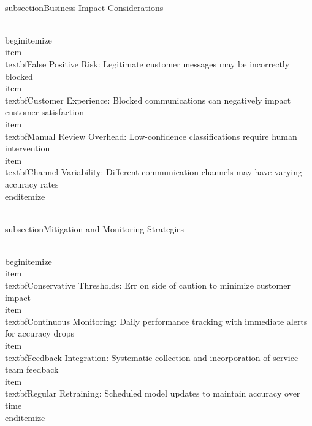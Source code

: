 \documentclass[12pt,a4paper]{article}
\begin{document}
\\subsection{Business Impact Considerations}

\\begin{itemize}
    \\item \\textbf{False Positive Risk}: Legitimate customer messages may be incorrectly blocked
    \\item \\textbf{Customer Experience}: Blocked communications can negatively impact customer satisfaction
    \\item \\textbf{Manual Review Overhead}: Low-confidence classifications require human intervention
    \\item \\textbf{Channel Variability}: Different communication channels may have varying accuracy rates
\\end{itemize}

\\subsection{Mitigation and Monitoring Strategies}

\\begin{itemize}
    \\item \\textbf{Conservative Thresholds}: Err on side of caution to minimize customer impact
    \\item \\textbf{Continuous Monitoring}: Daily performance tracking with immediate alerts for accuracy drops
    \\item \\textbf{Feedback Integration}: Systematic collection and incorporation of service team feedback
    \\item \\textbf{Regular Retraining}: Scheduled model updates to maintain accuracy over time
\\end{itemize}

\
\

\end{document}

